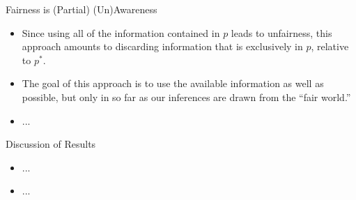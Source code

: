\documentclass[12pt,t,handout]{beamer}
\begin{document}

\begin{frame}[c]{Fairness is (Partial) (Un)Awareness}

\begin{center}
\begin{itemize}
  \itemsep10pt
  \item Since using all of the information contained in $p$ leads to unfairness,
    this approach amounts to discarding information that is exclusively in $p$,
    relative to $p^*$.
  \item The goal of this approach is to use the available information as well as
    possible, but only in so far as our inferences are drawn from the ``fair
    world.''
  \item ...
\end{itemize}
\end{center}


\end{frame}


\begin{frame}[c]{Discussion of Results}

\begin{center}
\begin{itemize}
  \itemsep10pt
  \item ...
  \item ...
\end{itemize}
\end{center}


\end{frame}

\end{document}

